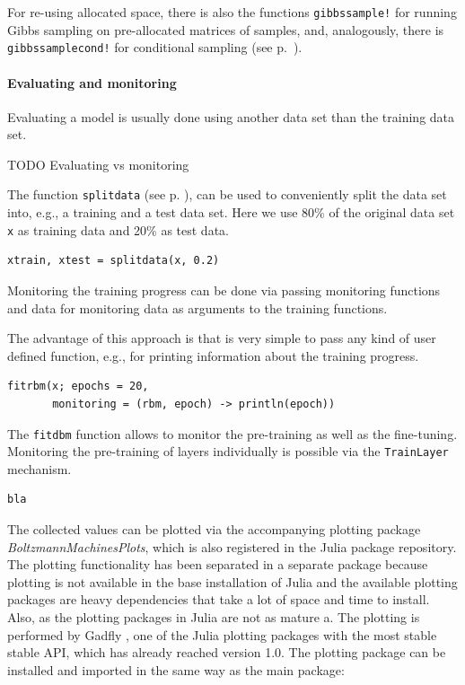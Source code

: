 \documentclass[12pt]{article}
\newcommand{\inlinecode}[1]{\texttt{#1}}
\newcommand{\apkg}[1]{\emph{#1}}
\begin{document}
For re-using allocated space, there is also the functions \inlinecode{gibbssample!} for running Gibbs sampling on pre-allocated matrices of samples, and, analogously, there is \inlinecode{gibbssamplecond!} for conditional sampling (see p.\ \pageref{bms_gibbssample!}).

\paragraph{Evaluating and monitoring}

Evaluating a model is usually done using another data set than the training data set.

TODO Evaluating vs monitoring

The function \inlinecode{splitdata} (see p. \pageref{bms_splitdata}), can be used to conveniently split the data set into, e.g., a training and a test data set.
Here we use 80\%  of the original data set \inlinecode{x} as training data and 20\% as test data.

\begin{lstlisting}
xtrain, xtest = splitdata(x, 0.2)
\end{lstlisting}

Monitoring the training progress can be done via passing monitoring functions and data for monitoring data as arguments to the training functions.

The advantage of this approach is that is very simple to pass any kind of user defined function, e.g., for printing information about the training progress.
\begin{lstlisting}
fitrbm(x; epochs = 20, 
       monitoring = (rbm, epoch) -> println(epoch))
\end{lstlisting}

The \inlinecode{fitdbm} function allows to monitor the pre-training as well as the fine-tuning.
Monitoring the pre-training of layers individually is possible via the \inlinecode{TrainLayer} mechanism.

\begin{lstlisting}[caption={Monitoring pre-training and fine-tuning},label={lst:monfitdbm}]
bla
\end{lstlisting}

The collected values can be plotted via the accompanying plotting package \apkg{Boltzmann\-Machines\-Plots}, which is also registered in the Julia package repository.
The plotting functionality has been separated in a separate package because plotting is not available in the base installation of Julia and the available plotting packages are heavy dependencies that take a lot of space and time to install.
Also, as the plotting packages in Julia are not as mature a. 
The plotting is performed by Gadfly \citep{gadfly}, one of the Julia plotting packages with the most stable stable API, which has already reached version 1.0.
The plotting package can be installed and imported in the same way as the main package:
\end{document}
